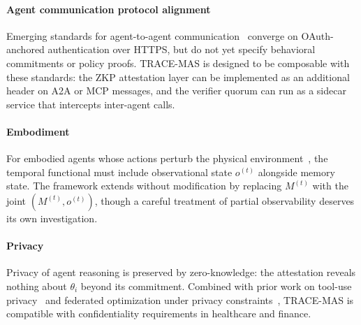 \documentclass[conference]{IEEEtran}
\begin{document}
\paragraph*{Agent communication protocol alignment}
Emerging standards for agent-to-agent communication~\cite{ref:agentsec2025,ref:a2a2025}
converge on OAuth-anchored authentication over HTTPS, but do not yet
specify behavioral commitments or policy proofs. \textsc{TRACE-MAS}
is designed to be composable with these standards: the ZKP attestation
layer can be implemented as an additional header on A2A or MCP
messages, and the verifier quorum can run as a sidecar service that
intercepts inter-agent calls.

\paragraph*{Embodiment}
For embodied agents whose actions perturb the physical
environment~\cite{ref:embodied2025}, the temporal functional must
include observational state $o^{(t)}$ alongside memory state. The
framework extends without modification by replacing $M^{(t)}$ with
the joint $(M^{(t)}, o^{(t)})$, though a careful treatment of partial
observability deserves its own investigation.

\paragraph*{Privacy}
Privacy of agent reasoning is preserved by zero-knowledge: the
attestation reveals nothing about $\theta_i$ beyond its commitment.
Combined with prior work on tool-use privacy~\cite{ref:tdsc2024}
and federated optimization under privacy constraints~\cite{ref:jas2024priv},
\textsc{TRACE-MAS} is compatible with confidentiality requirements
in healthcare and finance.
\end{document}
